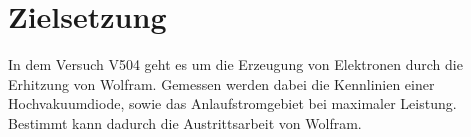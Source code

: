 \section{Zielsetzung} 

\begin{flushleft}
    In dem Versuch V504 geht es um die Erzeugung von Elektronen durch die Erhitzung von Wolfram.
    Gemessen werden dabei die Kennlinien einer Hochvakuumdiode, sowie das Anlaufstromgebiet bei maximaler Leistung.
    Bestimmt kann dadurch die Austrittsarbeit von Wolfram.
\end{flushleft}
